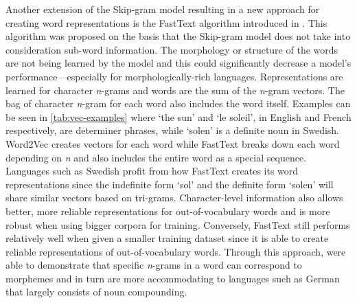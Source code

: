 Another extension of the Skip-gram model resulting in a new approach for creating word representations is the FastText algorithm introduced in \citet{bojanowski2017enriching}. This algorithm was proposed on the basis that the Skip-gram model does not take into consideration sub-word information. The morphology or structure of the words are not being learned by the model and this could significantly decrease a model’s performance—especially for morphologically-rich languages. Representations are learned for character \emph{n}-grams and words are the sum of the \emph{n}-gram vectors. The bag of character \emph{n}-gram for each word also includes the word itself. Examples can be seen in \autoref{tab:vec-examples} where `the sun' and `le soleil', in English and French respectively, are determiner phrases,  while `solen' is a definite noun in Swedish. Word2Vec creates vectors for each word while FastText breaks down each word depending on \emph{n} and also includes the entire word as a special sequence. Languages such as Swedish profit from how FastText creates its word representations since the indefinite form `sol' and the definite form `solen' will share similar vectors based on tri-grams. Character-level information also allows better, more reliable representations for out-of-vocabulary words and is more robust when using bigger corpora for training. Conversely, FastText still performs relatively well when given a smaller training dataset since it is able to create reliable representations of out-of-vocabulary words. Through this approach, \citet{bojanowski2017enriching} were able to demonstrate that specific \emph{n}-grams in a word can correspond to morphemes and in turn are more accommodating to languages such as German that largely consists of noun compounding.




